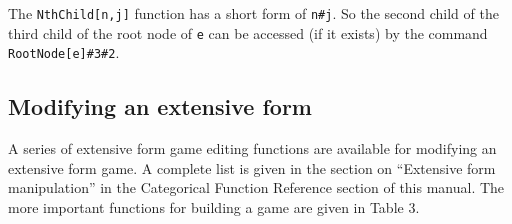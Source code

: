 The \verb+NthChild[n,j]+ function has a short form of
\verb+n#j+.  So the second child of the third child of the root node
of \verb+e+ can be accessed (if it exists) by the command
\verb+RootNode[e]#3#2+.

\subsection{Modifying an extensive form}

A series of extensive form game editing functions are available for
modifying an extensive form game. A complete list is given in the
section on ``Extensive form manipulation'' in the Categorical Function
Reference section of this manual.  The more important functions for
building a game are given in Table 3.

